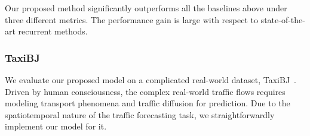 \documentclass[10pt,twocolumn,letterpaper]{article}
\begin{document}
Our proposed method significantly outperforms all the baselines above under three different metrics. The performance gain is large with respect to state-of-the-art recurrent methods.

\begin{table}[h]
\centering
\caption{Quantitative results of different methods on the Moving MNIST dataset ( frames).}
\label{tab:mmnist}
\end{table}

\subsubsection{TaxiBJ} We evaluate our proposed model on a complicated real-world dataset, TaxiBJ~\cite{zhang2017deep}. Driven by human consciousness, the complex real-world traffic flows requires modeling transport phenomena and traffic diffusion for prediction. Due to the spatiotemporal nature of the traffic forecasting task, we straightforwardly implement our model for it. 
\end{document}
